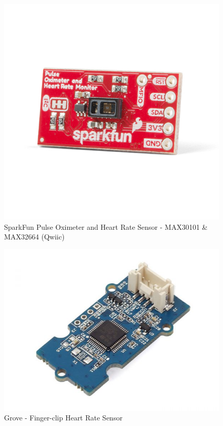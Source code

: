 \documentclass[12pt, titlepage]{article}
\begin{document}
\begin{figure}[H]
\centering
\includegraphics[scale = 1]{sparkfun} 
  \caption{SparkFun Pulse Oximeter and Heart Rate Sensor - MAX30101 \& MAX32664 (Qwiic)}
  \label{fig:sparkfun}
\end{figure}

\begin{figure}[H]
\centering
\includegraphics[scale = 0.5]{grove1}
  \caption{Grove - Finger-clip Heart Rate Sensor}
  \label{fig:grove1}
\end{figure}
\end{document}
